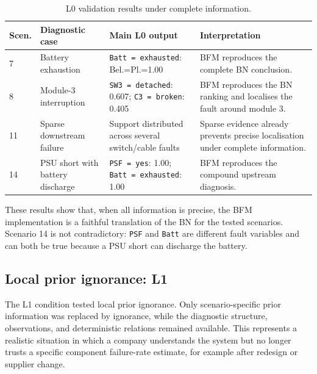 \documentclass[runningheads]{llncs}
\begin{document}
\begin{table}[H]
\caption{L0 validation results under complete information.}\label{tab:l0_results}
\centering
\small
\begin{tabularx}{\textwidth}{p{0.8cm}p{2.8cm}p{4.1cm}X}
\toprule
Scen. & Diagnostic case & Main L0 output & Interpretation \\
\midrule
7 & Battery exhaustion & \texttt{Batt = exhausted}: Bel.=Pl.=1.00 & BFM reproduces the complete BN conclusion. \\
8 & Module-3 interruption & \texttt{SW3 = detached}: 0.607; \texttt{C3 = broken}: 0.405 & BFM reproduces the BN ranking and localises the fault around module 3. \\
11 & Sparse downstream failure & Support distributed across several switch/cable faults & Sparse evidence already prevents precise localisation under complete information. \\
14 & PSU short with battery discharge & \texttt{PSF = yes}: 1.00; \texttt{Batt = exhausted}: 1.00 & BFM reproduces the compound upstream diagnosis. \\
\bottomrule
\end{tabularx}
\end{table}

These results show that, when all information is precise, the BFM implementation is a faithful translation of the BN for the tested scenarios. Scenario 14 is not contradictory: \texttt{PSF} and \texttt{Batt} are different fault variables and can both be true because a PSU short can discharge the battery.

\subsection{Local prior ignorance: L1}
\label{sec:l1_local_prior}

The L1 condition tested local prior ignorance. Only scenario-specific prior information was replaced by ignorance, while the diagnostic structure, observations, and deterministic relations remained available. This represents a realistic situation in which a company understands the system but no longer trusts a specific component failure-rate estimate, for example after redesign or supplier change.
\end{document}
